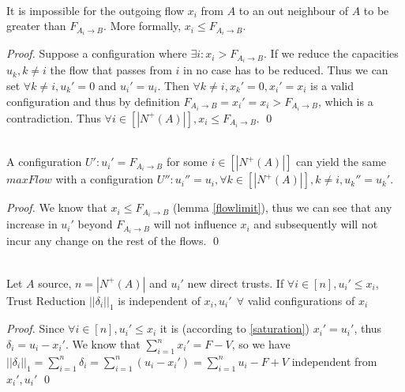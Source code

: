 \documentclass[11pt]{llncs}
\begin{document}
    \begin{lemma} \ \\
       \label{flowlimit}
       It is impossible for the outgoing flow $x_i$ from $A$ to an out neighbour of $A$ to be greater than
       $F_{A_i \rightarrow B}$. More formally, $x_i \leq F_{A_i \rightarrow B}$.
    \end{lemma}
    \begin{proof}
       Suppose a configuration where $\exists i : x_i > F_{A_i \rightarrow B}$. If we reduce the capacities $u_k, k \neq i$
       the flow that passes from $i$ in no case has to be reduced. Thus we can set $\forall k \neq i, u_k' = 0$ and $u_i' =
       u_i$. Then $\forall k \neq i,x_k' = 0, x_i' = x_i$ is a valid configuration and thus by definition $F_{A_i \rightarrow
       B} = x_i' = x_i > F_{A_i \rightarrow B}$, which is a contradiction. Thus $\forall i \in [|N^{+}(A)|], x_i \leq
       F_{A_i \rightarrow B}$. \qed
    \end{proof}

    \begin{theorem} \ \\
       \label{trustsave}
       A configuration $U' : u_i' = F_{A_i \rightarrow B}$ for some $i \in [|N^{+}(A)|]$ can yield the same $maxFlow$ with a
       configuration $U'' : u_i'' = u_i, \forall k \in [|N^{+}(A)|], k \neq i, u_k'' = u_k'$.
    \end{theorem}
    \begin{proof}
       We know that $x_i \leq F_{A_i \rightarrow B}$ (lemma \ref{flowlimit}), thus we can see that any increase in $u_i'$
       beyond $F_{A_i \rightarrow B}$ will not influence $x_i$ and subsequently will not incur any change on the rest of the
       flows. \qed
    \end{proof}

    \begin{theorem} \ \\
       \label{invariability}
       Let $A$ source, $n = |N^{+}(A)|$ and $u_i'$ new direct trusts. If $\forall i \in [n],u_i' \leq x_i$,
       Trust Reduction $||\delta_i||_1$ is independent of $x_i, u_i' \:\: \forall$ valid configurations of $x_i$
    \end{theorem}
    \begin{proof}
       Since $\forall i \in [n],u_i' \leq x_i$ it is (according to \ref{saturation}) $x_i' = u_i'$, thus
       $\delta_i = u_i - x_i'$. We know that $\sum\limits_{i=1}^{n}x_i' = F - V$, so we have $||\delta_i||_1 =
       \sum\limits_{i=1}^{n}\delta_i = \sum\limits_{i=1}^{n}(u_i - x_i') = \sum\limits_{i=1}^{n}u_i - F + V$ independent
       from $x_i', u_i'$ \qed
    \end{proof}
\end{document}
